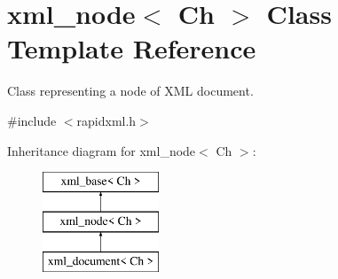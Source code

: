 \hypertarget{classrapidxml_1_1xml__node}{}\section{xml\+\_\+node$<$ Ch $>$ Class Template Reference}
\label{classrapidxml_1_1xml__node}


Class representing a node of X\+ML document.  




{\ttfamily \#include $<$rapidxml.\+h$>$}

Inheritance diagram for xml\+\_\+node$<$ Ch $>$\+:\begin{figure}[H]
\begin{center}
\leavevmode
\includegraphics[height=3.000000cm]{classrapidxml_1_1xml__node}
\end{center}
\end{figure}
